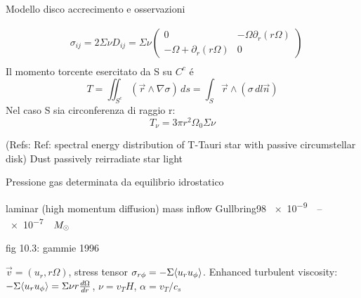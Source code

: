 \begin{reworking}{Modello disco accrecimento e osservazioni}
	\begin{workout}
		
	\end{workout}
	
	\begin{workout}
		\begin{align}
		&\sigma_{ij}=2\Sigma\nu D_{ij}=\Sigma\nu\begin{pmatrix}0&-\Omega\partial_r(r\Omega)\\-\Omega+\partial_r(r\Omega)&0
		\end{pmatrix}\\
		\end{align}
		Il momento torcente esercitato da S su $C^c$ \'e
		\begin{equation}
		T=\iint_{S^c}(\vec{r}\wedge\nabla\sigma)\,ds=\int_S\vec{r}\wedge(\sigma\,dl\vec{n})
		\end{equation}
		Nel caso S sia circonferenza di raggio r:
		\begin{equation}
		T_{\nu}=3\pi r^2\Omega_0\Sigma\nu
		\end{equation}
	\end{workout}
	
	\begin{workout}
		(Refs: Ref: spectral energy distribution of T-Tauri star with passive circumstellar disk)
		Dust passively reirradiate star light
	\end{workout}
	
	\begin{workout}
		Pressione gas determinata da equilibrio idrostatico
	\end{workout}
	
	\begin{workout}
		laminar (high momentum diffusion)
		mass inflow Gullbring98 \SIrange{e-9}{e-7}{\per\year}$M_{\odot}{}$
	\end{workout}
	\begin{workout}[MRI]
		fig 10.3:
		gammie 1996
	\end{workout}
	
	\begin{workout}
		$\vec{v}=(u_r,r\Omega)$, stress tensor $\sigma_{r\phi}=-\Sigma\langle u_ru_{\phi} \rangle$.
		Enhanced turbulent viscosity: $-\Sigma\langle u_ru_{\phi} \rangle=\Sigma\nu r\frac{d \Omega}{d r}$, $\nu=v_TH$, $\alpha=v_T/c_s$
	\end{workout}
	

\end{reworking}
